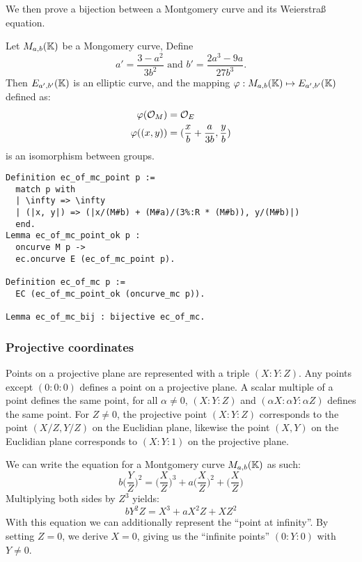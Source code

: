We then prove a bijection between a Montgomery curve and its Weierstra{\ss} equation.

\begin{lemma}
  Let $M_{a,b}(\mathbb{K})$ be a Mongomery curve, Define $$a' = \frac{3-a^2}{3b^2} \text{\ \ \ \ and\ \ \ \ } b' = \frac{2a^3 - 9a}{27b^3}.$$
  Then $E_{a',b'}(\mathbb{K})$ is an elliptic curve, and the mapping $\varphi : M_{a,b}(\mathbb{K}) \mapsto E_{a',b'}(\mathbb{K})$ defined as:
  \begin{align*}
    \varphi(\mathcal{O}_M) &= \mathcal{O}_E\\
    \varphi( (x , y) ) &= ( \frac{x}{b} + \frac{a}{3b} , \frac{y}{b} )
  \end{align*}
  is an isomorphism between groups.
\end{lemma}

\begin{lstlisting}[language=Coq]
Definition ec_of_mc_point p :=
  match p with
  | \infty => \infty
  | (|x, y|) => (|x/(M#b) + (M#a)/(3%:R * (M#b)), y/(M#b)|)
  end.
Lemma ec_of_mc_point_ok p :
  oncurve M p ->
  ec.oncurve E (ec_of_mc_point p).

Definition ec_of_mc p :=
  EC (ec_of_mc_point_ok (oncurve_mc p)).

Lemma ec_of_mc_bij : bijective ec_of_mc.
\end{lstlisting}


\subsubsection{Projective coordinates}
\label{projective}
Points on a projective plane are represented with a triple $(X:Y:Z)$. Any points except $(0:0:0)$ defines a point on a projective plane. A scalar multiple of a point defines the same point, \ie
for all $\alpha \neq 0$, $(X:Y:Z)$ and $(\alpha X:\alpha Y:\alpha Z)$ defines the same point. For $Z\neq 0$, the projective point $(X:Y:Z)$ corresponds to the point $(X/Z,Y/Z)$ on the Euclidian plane, likewise the point $(X,Y)$ on the Euclidian plane corresponds to $(X:Y:1)$ on the projective plane.

We can write the equation for a Montgomery curve $M_{a,b}(\mathbb{K})$ as such:
\begin{equation}
b \bigg(\frac{Y}{Z}\bigg)^2 = \bigg(\frac{X}{Z}\bigg)^3 + a \bigg(\frac{X}{Z}\bigg)^2 + \bigg(\frac{X}{Z}\bigg)
\end{equation}
Multiplying both sides by $Z^3$ yields:
\begin{equation}
b Y^2Z = X^3 + a X^2Z + XZ^2
\end{equation}
With this equation we can additionally represent the ``point at infinity''. By setting $Z=0$, we derive $X=0$, giving us the ``infinite points'' $(0:Y:0)$ with $Y\neq 0$.

